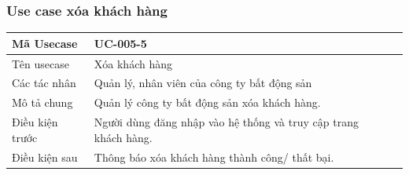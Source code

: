 \documentclass[12pt,a4paper]{article}
\begin{document}
    \subsubsection*{Use case xóa khách hàng }
    \begin{table}[H]
        \centering
        \begin{tabular}{|p{3.5cm}|p{11.5cm}|c|}
            \hline
            Mã Usecase      & UC-005-5                                                        \\
            \hline
            Tên usecase     & Xóa khách hàng                                                  \\
            \hline
            Các tác nhân    & Quản lý, nhân viên của công ty bất động sản                     \\
            \hline
            Mô tả chung     & Quản lý công ty bất động sản xóa khách hàng.                    \\
            \hline

            Điều kiện trước & Người dùng đăng nhập vào hệ thống và truy cập trang khách hàng. \\
            \hline

            Điều kiện sau   & Thông báo xóa khách hàng thành công/ thất bại.                  \\
            \hline


\end{tabular}
\end{table}
\end{document}
